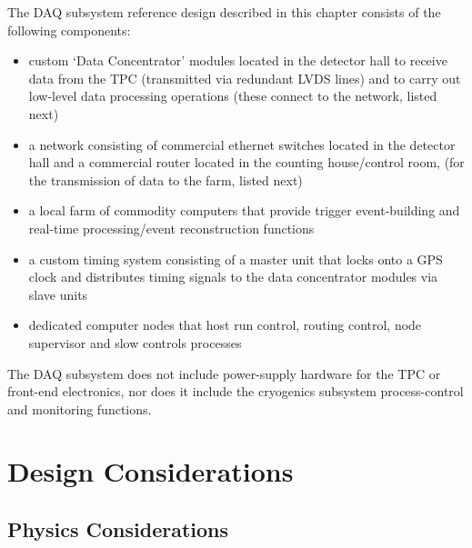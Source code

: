 
The DAQ subsystem reference design described in this chapter 
consists of the following components:
\begin{itemize}
  \item custom `Data Concentrator' modules located in the detector hall to 
        receive data from the TPC (transmitted via redundant LVDS lines) 
        and to carry out low-level data processing operations (these connect 
        to the network, listed next)
  \item a network consisting of commercial ethernet switches located 
        in the detector hall and a commercial router located in the 
        counting house/control room, (for the transmission of data to the farm, listed next)
  \item a local farm of commodity computers that provide trigger 
        event-building and 
        real-time processing/event reconstruction functions
  \item a custom timing system consisting of a master unit that locks onto a 
        GPS clock and distributes timing signals to the data concentrator 
        modules via slave units 
  \item dedicated computer nodes that host run control, routing control, 
        node supervisor and slow controls processes
\end{itemize}
%
The DAQ subsystem does not include power-supply hardware 
for the TPC or front-end electronics, nor does it include the 
cryogenics subsystem process-control and monitoring functions.


\section{Design Considerations}

\subsection{Physics Considerations}

